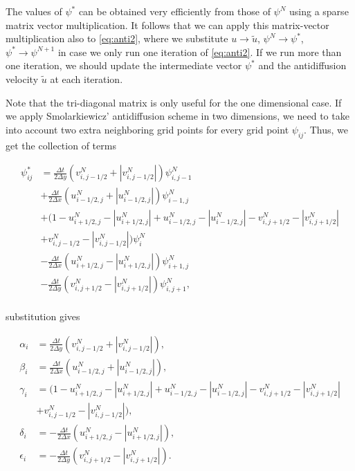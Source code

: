 \documentclass[10pt, a4paper]{article}
\newcommand{\abs}[1]{\left\lvert#1\right\rvert}
\begin{document}
The values of $\psi^*$ can be obtained very efficiently from those of $\psi^N$ using a sparse matrix vector multiplication. It follows that we can apply this matrix-vector multiplication also to \ref{eq:anti2}, where we substitute $u \rightarrow \tilde{u}$, $\psi^N \rightarrow \psi^*$, $\psi^* \rightarrow \psi^{N+1}$ in case we only run one iteration of \ref{eq:anti2}. If we run more than one iteration, we should update the intermediate vector $\psi^*$ and the antidiffusion velocity $\tilde{u}$ at each iteration.

Note that the tri-diagonal matrix is only useful for the one dimensional case. If we apply Smolarkiewicz' antidiffusion scheme in two dimensions, we need to take into account two extra neighboring grid points for every grid point $\psi_{ij}$. Thus, we get the collection of terms

\begin{align*}
\psi_{ij}^* &=
\frac{\Delta t}{2 \Delta y} \left( v_{i,j-1/2}^N + \abs{v_{i,j-1/2}^N} \right) \psi_{i,j-1}^N\\
&+\frac{\Delta t}{2 \Delta x} \left( u_{i-1/2,j}^N + \abs{u_{i-1/2,j}^N} \right) \psi_{i-1,j}^N\\
&+ \Big(1 - u_{i+1/2,j}^N - \abs{u_{i+1/2,j}^N} + u_{i-1/2,j}^N - \abs{u_{i-1/2,j}^N} - v_{i,j+1/2}^N - \abs{v_{i,j+1/2}^N} \\
&+ v_{i,j-1/2}^N - \abs{v_{i,j-1/2}^N} \Big) \psi_i^N\\
&-\frac{\Delta t}{2 \Delta x} \left( u_{i+1/2,j}^N - \abs{u_{i+1/2,j}^N} \right) \psi_{i+1,j}^N\\
&-\frac{\Delta t}{2 \Delta y} \left( v_{i,j+1/2}^N - \abs{v_{i,j+1/2}^N} \right) \psi_{i,j+1}^N,\\
\end{align*}

substitution gives

\begin{align*}
\alpha_i &= \frac{\Delta t}{2 \Delta y} \left( v_{i,j-1/2}^N + \abs{v_{i,j-1/2}^N} \right),\\
\beta_i &= \frac{\Delta t}{2 \Delta x} \left( u_{i-1/2,j}^N + \abs{u_{i-1/2,j}^N} \right),\\
\gamma_i &= \Big(1 - u_{i+1/2,j}^N - \abs{u_{i+1/2,j}^N} + u_{i-1/2,j}^N - \abs{u_{i-1/2,j}^N} - v_{i,j+1/2}^N - \abs{v_{i,j+1/2}^N} \\
&+ v_{i,j-1/2}^N - \abs{v_{i,j-1/2}^N} \Big),\\
\delta_i &= -\frac{\Delta t}{2 \Delta x} \left( u_{i+1/2,j}^N - \abs{u_{i+1/2,j}^N} \right),\\
\epsilon_i &= -\frac{\Delta t}{2 \Delta y} \left( v_{i,j+1/2}^N - \abs{v_{i,j+1/2}^N} \right).
\end{align*}
\end{document}
